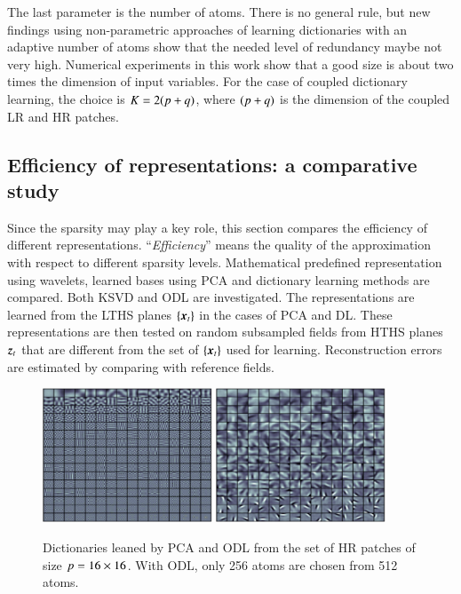 The last parameter is the number of atoms. There is no general rule, but new findings using non-parametric approaches of learning dictionaries with an adaptive number of atoms \citep{dang2016towards} show that the needed level of redundancy maybe not very high. Numerical experiments in this work show that a good size is about two times the dimension of input variables. For the case of coupled dictionary learning, the choice is $ K = 2(p+q) $, where $ (p+q) $ is the dimension of the coupled LR and HR patches.

\subsection{Efficiency of representations: a comparative study} 
Since the sparsity may play a key role, this section compares the efficiency of different representations. ``\textit{Efficiency}'' means the quality of the approximation with respect to different sparsity levels. Mathematical predefined representation using wavelets, learned bases using PCA and dictionary learning methods are compared. Both KSVD \citep{aharon2006ksvd} and ODL \citep{mairal2010online} are investigated. The representations are learned from the LTHS planes $ \left\lbrace \operatorname{\boldsymbol{x}}_t \right\rbrace $ in the cases of PCA and DL. These representations are then tested on random subsampled fields from HTHS planes $ \operatorname{\boldsymbol{z}}_t $ that are different from the set of $ \{\operatorname{\boldsymbol{x}}_t\} $ used for learning. Reconstruction errors are estimated by comparing with reference fields. 

\begin{figure}[t]
\centering
	\includegraphics[width=0.45\textwidth]{./images/DL/DLstat/PCA_patchsize04.eps}
	\includegraphics[width=0.45\textwidth]{./images/DL/DLstat/D_HR_lambda005.eps}
	\caption{\label{fig:PODvsDL} Dictionaries leaned by PCA and ODL from the set of HR patches of size $ p = 16 \times 16 $. With ODL, only 256 atoms are chosen from 512 atoms.}
\end{figure}

